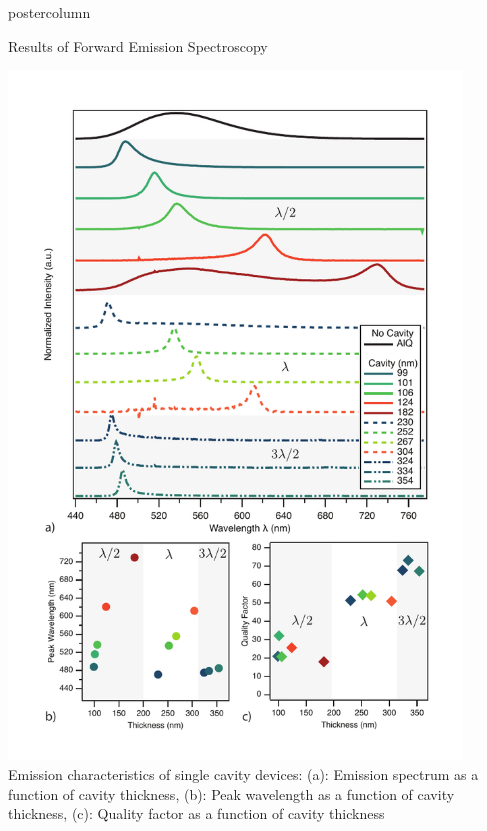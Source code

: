 \documentclass[10pt,papersize={24in,36in}]{beamer}
\begin{document}
\begin{frame}
\begin{columns}
\begin{column}{.49\textwidth}
\begin{beamercolorbox}[center,wd=\textwidth]{postercolumn}
\begin{minipage}[T]{.95\textwidth}
{\begin{block}{Results of Forward Emission Spectroscopy}
\begin{minipage}{0.55\textwidth}
                    \includegraphics[width=0.9\textwidth]{images/F_N1FPPrelim.pdf}
                    \small Emission characteristics of single cavity devices: (a): Emission spectrum as a function of cavity thickness, (b): Peak wavelength as a function of cavity thickness, (c): Quality factor as a function of cavity thickness
                \end{minipage}


\end{block}}
\end{minipage}
\end{beamercolorbox}
\end{column}
\end{columns}
\end{frame}
\end{document}
